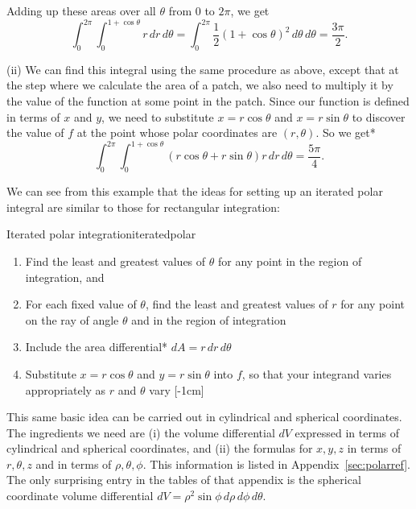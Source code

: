 \documentclass[svgnames]{watsonbook}
\begin{document}
\begin{solution}
      Adding up these areas over all $\theta$ from $0$ to $2\pi$, we
      get
      \[
        \int_0^{2\pi} \int_0^{1+\cos \theta} r \, dr \, d\theta =
                \int_0^{2\pi}\frac{1}{2}(1+\cos \theta)^2 \, d\theta \,
                d\theta  =  \boxed{\frac{3\pi}{2}}. 
              \]
              
              
    (ii) We can find this integral using the same procedure as above,
    except that at the step where we calculate the area of a patch, we
    also need to multiply it by the value of the function at some point
    in the patch. Since our function is defined in terms of $x$ and
    $y$, we need to substitute $x = r\cos \theta$ and $x = r\sin
    \theta$ to discover the value of $f$ at the point whose polar
    coordinates are $(r,\theta)$. So we get*
    \[
      \int_0^{2\pi} \int_0^{1+\cos \theta} (r \cos\theta + r\sin
      \theta)r \, dr \, d\theta = \boxed{\frac{5\pi}{4}}. 
    \]
\end{solution}

We can see from this example that the ideas for setting up an iterated
polar integral are similar to those for 
rectangular integration:
\begin{obs}{Iterated polar integration}{iteratedpolar}
\begin{enumerate}[itemsep = 6pt, topsep = 5pt, leftmargin=12pt]
\item Find the least and greatest values of $\theta$ for any point in
  the region of integration, and 
\item For each fixed value of $\theta$, find the least and greatest
  values of $r$ for any point on the ray of angle $\theta$ and in the
  region of integration
\item Include the area differential* $dA = r \, dr \, d\theta$
\item Substitute $x = r \cos\theta$ and $y=r\sin \theta$ into $f$, so
  that your integrand varies appropriately as $r$ and $\theta$ vary 
  [-1cm]
\end{enumerate}
\end{obs}

This same basic idea can be carried out in cylindrical and spherical
coordinates. The ingredients we need are (i) the volume differential
$dV$ expressed in terms of cylindrical and spherical coordinates, and
(ii) the formulas for $x, y, z$ in terms of $r, \theta, z$ and in
terms of $\rho, \theta, \phi$. This information is listed in
Appendix~\ref{sec:polarref}. The only surprising entry in the tables
of that appendix is the spherical coordinate volume differential $dV =
\rho^2 \sin \phi \, d\rho \, d \phi \, d\theta$.
\end{document}
